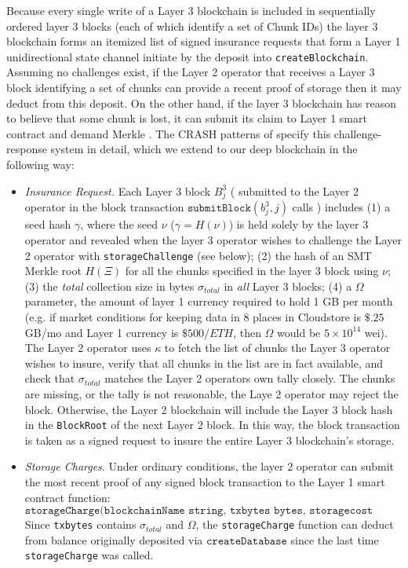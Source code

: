 \documentclass{article}
\newcommand{\block}[2]{B^{#1}_{#2}}
\newcommand{\blockhash}[2]{b^{#1}_{#2}}
\newcommand{\keyroot}{\kappa}
\newcommand{\hash}[1]{H(#1)}
\newcommand{\submitblock}[2]{\texttt{submitBlock}(#2, #1)}
\newcommand{\maxstoragecost}{\Omega}
\newcommand{\seedhash}{\gamma}
\newcommand{\seed}{\nu}
\begin{document}
Because every single write of a Layer 3 blockchain is included in sequentially ordered layer 3 blocks (each of which identify a set of Chunk IDs) the layer 3 blockchain forms an itemized list of signed insurance requests that form a Layer 1 unidirectional state channel initiate by the deposit into \texttt{createBlockchain}.  Assuming no challenges exist, if the Layer 2 operator that receives a Layer 3 block identifying a set of chunks can provide a recent proof of storage then it may deduct from this deposit.   On the other hand, if the layer 3 blockchain has reason to believe that some chunk is lost, it can submit its claim to Layer 1 smart contract and demand Merkle .   The CRASH patterns of \cite{swarm} specify this challenge-response system in detail, which we extend to our deep blockchain in the following way:
\begin{itemize}
    \item  {\em Insurance Request.} Each Layer 3 block $\block{3}{j}$ ( submitted to the Layer 2 operator in the block transaction $\submitblock{j}{\blockhash{3}{j}}$ calls ) includes (1) a seed hash $\seedhash$, where the seed $\seed$ ($\seedhash=\hash{\seed}$) is held solely by the layer 3 operator and  revealed when the layer 3 operator wishes to challenge the Layer 2 operator with \texttt{storageChallenge} (see below); (2) the hash of an SMT Merkle root $H(\Xi)$ for all the chunks specified in the layer 3 block using $\seed$; (3)   the {\em total} collection size in bytes $\sigma_{total}$ in {\em all} Layer 3 blocks; (4) a $\maxstoragecost$ parameter, the amount of layer 1 currency required to hold 1 GB per month (e.g. if market conditions for keeping data in 8 places in Cloudstore is $\$.25$ GB/mo and Layer 1 currency is $\$500/ETH$, then $\maxstoragecost$ would be $5\times10^14$ wei).  The Layer 2 operator uses $\keyroot$ to fetch the list of chunks the Layer 3 operator wishes to insure, verify that all chunks in the list are in fact available, and check that $\sigma_{total}$ matches the  Layer 2 operators own tally closely.  The chunks are missing, or the tally is not reasonable, the Laye 2 operator may reject the block.  Otherwise, the Layer 2 blockchain will include the Layer 3 block hash in the  \texttt{BlockRoot} of the next Layer 2 block.  In this way, the block transaction is taken as a signed request to insure the entire Layer 3 blockchain's storage.

    \item {\em Storage Charges}.   Under ordinary conditions, the layer 2 operator can submit the most recent proof of any signed block transaction to the Layer 1 smart contract function:
    \[
    \texttt{storageCharge(blockchainName string, txbytes bytes, storagecost uint64, sig bytes)}
    \]
    Since \texttt{txbytes}  contains $\sigma_{total}$ and $\maxstoragecost$, the \texttt{storageCharge} function can deduct from balance originally deposited via $\texttt{createDatabase}$ since the last time \texttt{storageCharge} was called.


\end{itemize}
\end{document}
